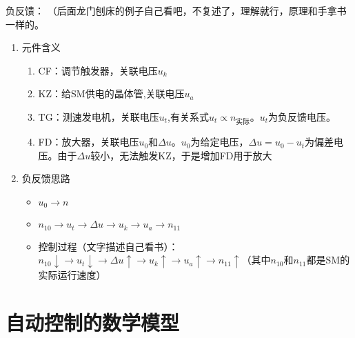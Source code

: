 \documentclass[oneside,a4paper]{ctexbook}
\begin{document}
负反馈：
（后面龙门刨床的例子自己看吧，不复述了，理解就行，原理和手拿书一样的。
\begin{enumerate}
    \item 元件含义
    \begin{enumerate}
        \item CF：调节触发器，关联电压$u_k$
        \item KZ：给SM供电的晶体管,关联电压$u_a$
        \item TG：测速发电机，关联电压$u_t$,有关系式$u_t\propto n_{实际}$。$u_t$为负反馈电压。
        \item FD：放大器，关联电压$u_0$和$\Delta u$。$u_0$为给定电压，$\Delta u = u_0 - u_t$为偏差电压。由于$\Delta u$较小，无法触发KZ，于是增加FD用于放大
    \end{enumerate}
    \item 负反馈思路
    \begin{itemize}
        \item $u_0 \to n$
        \item $n_{10} \to u_t \to \Delta u \to u_k \to u_a \to n_{11}$
        \item 控制过程（文字描述自己看书）：$n_{10}\downarrow \to u_t\downarrow \to \Delta u\uparrow \to u_k\uparrow \to u_a\uparrow \to n_{11}\uparrow$（其中$n_{10}$和$n_{11}$都是SM的实际运行速度）
    \end{itemize}
\end{enumerate}










\chapter{自动控制的数学模型}



\end{document}
